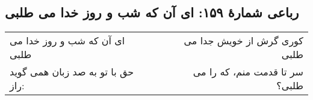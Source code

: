 \begin{center}
\section*{رباعی شمارهٔ ۱۵۹: ای آن که شب و روز خدا می طلبی}
\label{sec:159}
\begin{longtable}{l p{0.5cm} r}
ای آن که شب و روز خدا می طلبی
&&
کوری گرش از خویش جدا می طلبی
\\
حق با تو به صد زبان همی گوید راز:
&&
سر تا قدمت منم، که را می طلبی؟
\\
\end{longtable}
\end{center}
